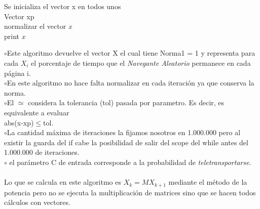 \documentclass[a4paper]{article}
\begin{document}
\IncMargin{1em}
\begin{algorithm}

\BlankLine

Se inicializa el vector x en todos unos \\
Vector xp\\
normalizar el vector \emph{x} \\
print \emph{x}
\end{algorithm}\DecMargin{1em}

$\circ$Este algoritmo devuelve el vector X el cual tiene Norma1 = 1 y representa para cada $X_i$ el porcentaje de tiempo que el \textit{Navegante Aleatorio} permanece en cada p\'agina i. \\
\indent $\circ$En este algoritmo no hace falta normalizar en cada iteraci\'on ya que conserva la norma.\\
\indent $\circ$El $\simeq$ considera la tolerancia (tol) pasada por parametro. Es decir, es equivalente a evaluar \\ abs(x-xp)$\leq$tol. \\
\indent $\circ$La cantidad m\'axima de iteraciones la fijamos nosotros en 1.000.000 pero al existir la guarda del if cabe la posibilidad de salir del scope del while antes del 1.000.000 de iteraciones. \\
\indent $\circ$ el par\'ametro C de entrada corresponde a la probabilidad de \textit{teletransportarse}.\\
\\
Lo que se calcula en este algoritmo es $X_k = M X_{k+1}$ mediante el m\'etodo de la potencia pero no se ejecuta la multiplicaci\'on de matrices sino que se hacen todos c\'alculos con vectores.

\newpage
\end{document}
